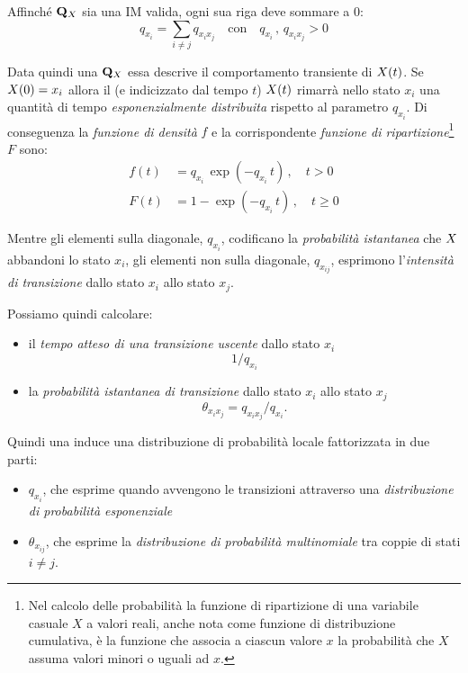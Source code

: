 Affinché $\mathbf{Q}_{\mathnormal{X}}$ sia una \acl{IM} valida, ogni sua riga deve sommare a $0$:
\[
q_{x_i}=\sum_{i \neq j}q_{x_ix_j}\quad\text{con}\quad q_{x_i}\,,\,q_{x_ix_j}>0
\]

Data quindi una \im*{} $\mathbf{Q}_{\mathnormal{X}}$ essa descrive il comportamento transiente di $\mathnormal{X}(t)$. Se $\mathnormal{X}(0)=x_i$ allora il \mprocess*{} \omog*{} (e indicizzato dal tempo $t$) $\mathnormal{X}(t)$ rimarrà nello stato $x_i$ una quantità di tempo \emph{esponenzialmente distribuita} rispetto al parametro $q_{x_i}$. Di conseguenza la \emph{funzione di densità} $f$ e la corrispondente \emph{funzione di ripartizione}\footnote{Nel calcolo delle probabilità la funzione di ripartizione di una variabile casuale $X$ a valori reali, anche nota come funzione di distribuzione cumulativa, è la funzione che associa a ciascun valore $x$ la probabilità che $X$ assuma valori minori o uguali ad $x$.} $F$ sono:
\begin{equation}
\label{eq:im-distrib}
\begin{split}
f(t) &= q_{x_i}\,\exp(-q_{x_i}\,t)\,,\quad t>0 \\
F(t) &= 1-\exp(-q_{x_i}\,t)\,,\quad t\geq0
\end{split} 
\end{equation}

Mentre gli elementi sulla diagonale, $q_{x_i}$, codificano la \emph{probabilità istantanea} che $\mathnormal{X}$ abbandoni lo stato $x_i$, gli elementi non sulla diagonale, $q_{x_{ij}}$, esprimono l'\emph{intensità di transizione} dallo stato $x_i$ allo stato $x_j$. 

Possiamo quindi calcolare:
\begin{itemize}
    \item il \emph{tempo atteso di una transizione uscente} dallo stato $x_i$ \[1/q_{x_i}\]
    \item la \emph{probabilità istantanea di transizione} dallo stato $x_i$ allo stato $x_j$ \[\theta_{x_ix_j}=q_{x_ix_j}/q_{x_i}\text{.}\]
\end{itemize}

Quindi una \im*{} induce una distribuzione di probabilità locale fattorizzata in due parti:
\begin{itemize}
    \item $q_{x_i}$, che esprime quando avvengono le transizioni attraverso una \emph{distribuzione di probabilità esponenziale}
    \item $\theta_{x_{ij}}$, che esprime la \emph{distribuzione di probabilità multinomiale} tra coppie di stati $i \neq j$.
\end{itemize}

